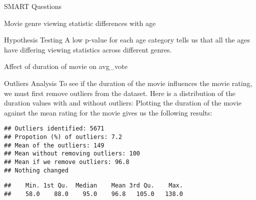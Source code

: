 \documentclass[
  ignorenonframetext,
]{beamer}
\newenvironment{Shaded}{\begin{snugshade}}{\end{snugshade}}
\newcommand{\AttributeTok}[1]{\textcolor[rgb]{0.77,0.63,0.00}{#1}}
\newcommand{\CommentTok}[1]{\textcolor[rgb]{0.56,0.35,0.01}{\textit{#1}}}
\newcommand{\ConstantTok}[1]{\textcolor[rgb]{0.00,0.00,0.00}{#1}}
\newcommand{\FunctionTok}[1]{\textcolor[rgb]{0.00,0.00,0.00}{#1}}
\newcommand{\NormalTok}[1]{#1}
\newcommand{\OtherTok}[1]{\textcolor[rgb]{0.56,0.35,0.01}{#1}}
\newcommand{\SpecialCharTok}[1]{\textcolor[rgb]{0.00,0.00,0.00}{#1}}
\begin{document}
\begin{frame}[fragile]{SMART Questions}
\begin{block}{Movie genre viewing statistic differences with age}
\begin{block}{Hypothesis Testing}
A low p-value for each age category tells us that all the ages have
differing viewing statistics across different genres.
\end{block}
\end{block}

\begin{block}{Affect of duration of movie on avg\_vote}
\protect\hypertarget{affect-of-duration-of-movie-on-avg_vote}{}
\begin{block}{Outliers Analysis}
\protect\hypertarget{outliers-analysis}{}
To see if the duration of the movie influences the movie rating, we must
first remove outliers from the dataset. Here is a distribution of the
duration values with and without outliers: Plotting the duration of the
movie against the mean rating for the movie gives us the following
results:

\begin{Shaded}
\end{Shaded}

\begin{verbatim}
## Outliers identified: 5671 
## Propotion (%) of outliers: 7.2 
## Mean of the outliers: 149 
## Mean without removing outliers: 100 
## Mean if we remove outliers: 96.8 
## Nothing changed
\end{verbatim}

\begin{Shaded}
\end{Shaded}

\begin{verbatim}
##    Min. 1st Qu.  Median    Mean 3rd Qu.    Max. 
##    58.0    88.0    95.0    96.8   105.0   138.0
\end{verbatim}


\end{block}
\end{block}
\end{frame}
\end{document}
